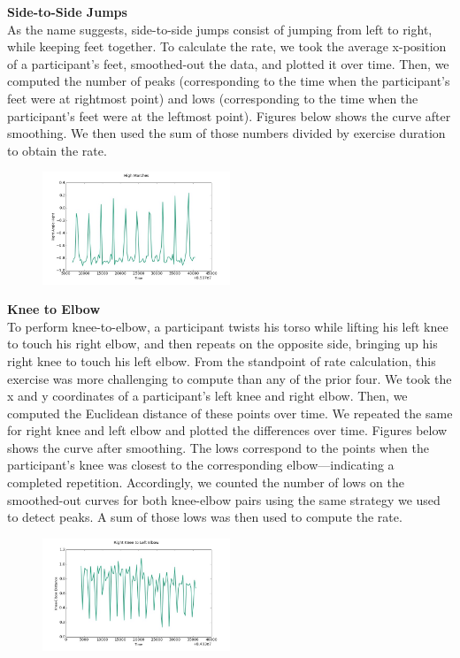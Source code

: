 \textbf{Side-to-Side Jumps} \\
As the name suggests, side-to-side jumps consist of jumping from left to right, while keeping feet together. To calculate the rate, we took the average x-position of a participant's feet, smoothed-out the data, and plotted it over time. Then, we computed the number of peaks (corresponding to the time when the participant's feet were at rightmost point) and lows (corresponding to the time when the participant's feet were at the leftmost point). Figures below shows the curve after smoothing. We then used the sum of those numbers divided by exercise duration to obtain the rate.
\begin{figure} [htp]
	\includegraphics[width=0.5\textwidth]{images/hm}
\end{figure}

\textbf{Knee to Elbow} \\
To perform knee-to-elbow, a participant twists his torso while lifting his left knee to touch his right elbow, and then repeats on the opposite side, bringing up his right knee to touch his left elbow. From the standpoint of rate calculation, this exercise was more challenging to compute than any of the prior four. We took the x and y coordinates of a participant's left knee and right elbow. Then, we computed the Euclidean distance of these points over time. We repeated the same for right knee and left elbow and plotted the differences over time. Figures below shows the curve after smoothing. The lows correspond to the points when the participant's knee was closest to the corresponding elbow---indicating a completed repetition. Accordingly, we counted the number of lows on the smoothed-out curves for both knee-elbow pairs using the same strategy we used to detect peaks. A sum of those lows was then used to compute the rate.
\begin{figure} [htp]
	\includegraphics[width=0.5\textwidth]{images/ke}
\end{figure}

